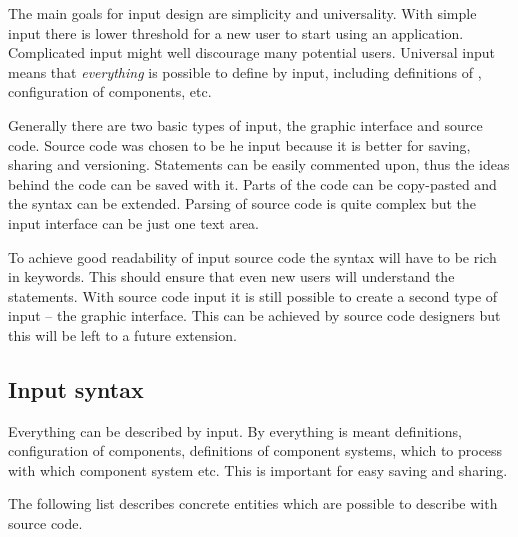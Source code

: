 The main goals for input design are simplicity and universality.
With simple input there is lower threshold for a new user to start using an application.
Complicated input might well discourage many potential users.
Universal input means that \textit{everything} is possible to define by input, including definitions of \lsystems, configuration of components, etc.

Generally there are two basic types of input, the graphic interface and source code.
Source code was chosen to be he input because it is better for saving, sharing and versioning.
Statements can be easily commented upon, thus the ideas behind the code can be saved with it.
Parts of the code can be copy-pasted and the syntax can be extended.
Parsing of source code is quite complex but the input interface can be just one text area.

To achieve good readability of input source code the syntax will have to be rich in keywords.
This should ensure that even new users will understand the statements.
With source code input it is still possible to create a second type of input -- the graphic interface.
This can be achieved by source code designers but this will be left to a future extension.


\subsection{Input syntax}

Everything can be described by input.
By everything is meant \lsystem definitions, configuration of components, definitions of component systems, which \lsystem to process with which component system etc.
This is important for easy saving and sharing.

The following list describes concrete entities which are possible to describe with source code.

